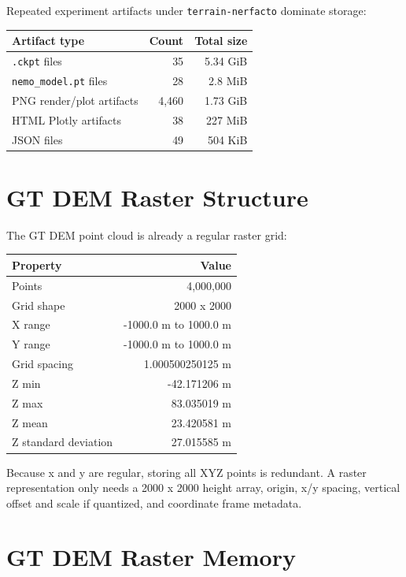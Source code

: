 \documentclass[10pt]{article}
\begin{document}
Repeated experiment artifacts under \texttt{terrain-nerfacto} dominate storage:

\begin{center}
\begin{tabular}{lrr}
\toprule
Artifact type & Count & Total size \\
\midrule
\texttt{.ckpt} files & 35 & 5.34 GiB \\
\texttt{nemo\_model.pt} files & 28 & 2.8 MiB \\
PNG render/plot artifacts & 4,460 & 1.73 GiB \\
HTML Plotly artifacts & 38 & 227 MiB \\
JSON files & 49 & 504 KiB \\
\bottomrule
\end{tabular}
\end{center}

\section{GT DEM Raster Structure}

The GT DEM point cloud is already a regular raster grid:

\begin{center}
\begin{tabular}{lr}
\toprule
Property & Value \\
\midrule
Points & 4,000,000 \\
Grid shape & 2000 x 2000 \\
X range & -1000.0 m to 1000.0 m \\
Y range & -1000.0 m to 1000.0 m \\
Grid spacing & 1.000500250125 m \\
Z min & -42.171206 m \\
Z max & 83.035019 m \\
Z mean & 23.420581 m \\
Z standard deviation & 27.015585 m \\
\bottomrule
\end{tabular}
\end{center}

Because x and y are regular, storing all XYZ points is redundant. A raster representation only needs a 2000 x 2000 height array, origin, x/y spacing, vertical offset and scale if quantized, and coordinate frame metadata.

\section{GT DEM Raster Memory}
\end{document}
